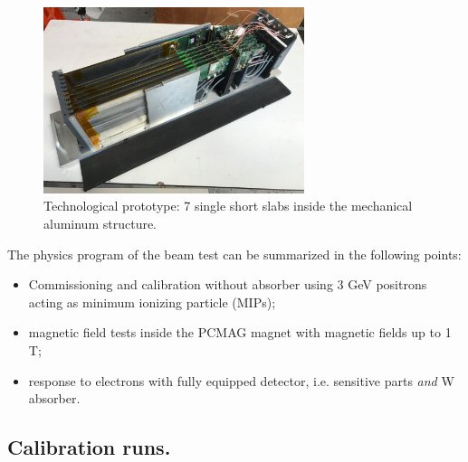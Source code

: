\documentclass[journal]{IEEEtran}
\begin{document}

\begin{figure}[!t]
\centering
\includegraphics[width=3.0in]{proto-eps-converted-to.pdf}
\caption{Technological prototype: 7 single short slabs inside the mechanical aluminum structure.}
\label{prototype}
\end{figure}

The physics program of the beam test can be summarized in the following points:

\begin{itemize}
\item Commissioning and calibration without absorber using 3 GeV positrons acting as minimum ionizing particle (MIPs);
\item magnetic field tests inside the PCMAG magnet with magnetic fields up to 1 T;
\item response to electrons with fully equipped detector, i.e. sensitive parts {\it and} W absorber.
\end{itemize}

\subsection{Calibration runs.}
\end{document}
